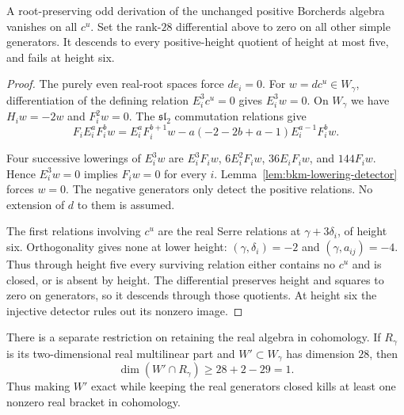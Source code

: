 \begin{theorem}
\label{thm:bkm-serre-nonextension}
A root-preserving odd derivation of the unchanged positive
Borcherds algebra vanishes on all $c^u$.
Set the rank-$28$ differential above to zero on all other simple
generators. It descends to every positive-height quotient of height
at most five, and fails at height six.
\end{theorem}
\begin{proof}
The purely even real-root spaces force $de_i=0$.
For $w=dc^u\in W_\gamma$, differentiation of the defining relation
$E_i^3c^u=0$ gives $E_i^3w=0$. On $W_\gamma$ we have
$H_iw=-2w$ and $F_i^2w=0$. The $\mathfrak{sl}_2$ commutation
relations give
\[
 F_iE_i^aF_i^bw
 =E_i^aF_i^{b+1}w
   -a(-2-2b+a-1)E_i^{a-1}F_i^bw.
\]

Four successive lowerings of $E_i^3w$ are
$E_i^3F_iw$, $6E_i^2F_iw$, $36E_iF_iw$, and $144F_iw$.
Hence $E_i^3w=0$ implies $F_iw=0$ for every $i$.
Lemma~\ref{lem:bkm-lowering-detector} forces $w=0$.
The negative generators only detect the positive relations. No
extension of $d$ to them is assumed.

The first relations involving $c^u$ are the real Serre relations
at $\gamma+3\delta_i$, of height six. Orthogonality gives none
at lower height: $(\gamma,\delta_i)=-2$ and
$(\gamma,a_{ij})=-4$. Thus through height five every surviving
relation either contains no $c^u$ and is closed, or is absent by
height. The differential preserves height and squares to zero on
generators, so it descends through those quotients. At height six
the injective detector rules out its nonzero image.
\end{proof}

There is a separate restriction on retaining the real algebra in
cohomology. If $R_\gamma$ is its two-dimensional real multilinear
part and $W'\subset W_\gamma$ has dimension $28$, then
\[
 \dim(W'\cap R_\gamma)\geq28+2-29=1.
\]
Thus making $W'$ exact while keeping the real generators closed
kills at least one nonzero real bracket in cohomology.

